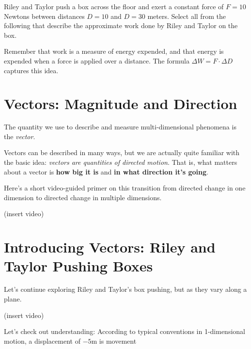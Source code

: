 \documentclass{ximera}
\begin{document}
\begin{problem}
Riley and Taylor push a box across the floor and exert a constant force of $F=10$ Newtons between distances $D=10$ and $D=30$ meters. Select all from the following that describe the approximate work done by Riley and Taylor on the box.

\begin{selectAll}
\end{selectAll}
\begin{feedback}
Remember that work is a measure of energy expended, and that energy is expended when a force is applied over a distance. The formula $\Delta W=F\cdot \Delta D$ captures this idea.
\end{feedback}
\end{problem}


\section*{Vectors: Magnitude and Direction}

The quantity we use to describe and measure multi-dimensional phenomena is the \emph{vector}. 

Vectors can be described in many ways, but we are actually quite familiar with the basic idea: \emph{vectors are quantities of directed motion}. That is, what matters about a vector is {\bf how big it is} and {\bf in what direction it's going}.

Here's a short video-guided primer on this transition from directed change in one dimension to directed change in multiple dimensions.

(insert video)

\section*{Introducing Vectors: Riley and Taylor Pushing Boxes}

    Let's continue exploring Riley and Taylor's box pushing, but as they vary along a plane.

    (insert video)

\begin{problem}
    Let's check out understanding: According to typical conventions in 1-dimensional motion, a displacement of $-5$m is movement 
\end{problem}
    
\end{document}
